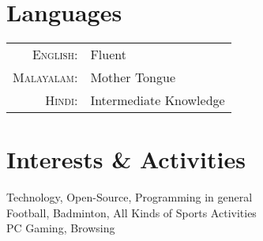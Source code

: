 \documentclass[a4paper,10pt]{article}
\begin{document}
\section{Languages}
\begin{tabular}{rl}
\textsc{English:}&Fluent\\
\textsc{Malayalam:}&Mother Tongue\\
\textsc{Hindi:}&Intermediate Knowledge
\end{tabular}



\section{Interests \& Activities}
Technology, Open-Source, Programming in general\\
Football, Badminton, All Kinds of Sports Activities\\
PC Gaming, Browsing


\end{document}
